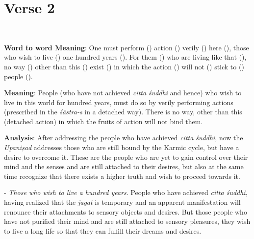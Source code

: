 \chapter{Verse 2}

\begin{moolashloka}
\\
\end{moolashloka}

\textbf{Word to word Meaning}: One must perform () action () verily () here (), those who wish to live () one hundred years (). For them () who are living like that (), no way () other than this () exist () in which the action () will not () stick to () people ().

\textbf{Meaning}: People (who have not achieved \emph{citta śuddhi} and hence) who wish to live in this world for hundred years, must do so by verily performing actions (prescribed in the \emph{śāstra-s} in a detached way). There is no way, other than this (detached action) in which the fruits of action will not bind them.

\textbf{Analysis}: After addressing the people who have achieved \emph{citta śuddhi}, now the \emph{Upaniṣad} addresses those who are still bound by the Karmic cycle, but have a desire to overcome it. These are the people who are yet to gain control over their mind and the senses and are still attached to their desires, but also at the same time recognize that there exists a higher truth and wish to proceed towards it.

- \emph{Those who wish to live a hundred years}. People who have achieved \emph{citta śuddhi}, having realized that the \emph{jagat} is temporary and an apparent manifestation will renounce their attachments to sensory objects and desires. But those people who have not purified their mind and are still attached to sensory pleasures, they wish to live a long life so that they can fulfill their dreams and desires.

